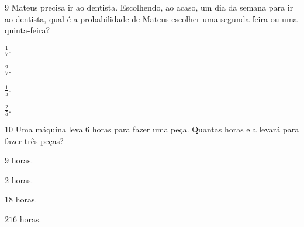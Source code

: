 
\num{9}  Mateus precisa ir ao dentista. Escolhendo, ao acaso, um dia
da semana para ir ao dentista, qual é a probabilidade de Mateus escolher
uma segunda-feira ou uma quinta-feira?

\begin{escolha}
\item $\frac{1}{7}$.
\item $\frac{2}{7}$.
\item $\frac{1}{5}$.
\item $\frac{2}{5}$.
\end{escolha}




\num{10} Uma máquina leva $6$ horas para fazer uma peça. Quantas horas ela
levará para fazer três peças?

\begin{escolha}
\item $9$ horas.
\item $2$ horas.
\item $18$ horas.
\item $216$ horas.
\end{escolha}

